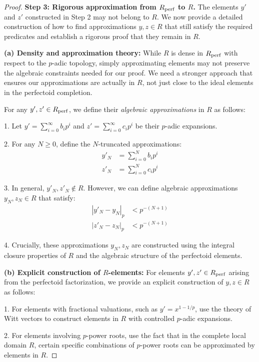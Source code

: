 \begin{proof}
\textbf{Step 3: Rigorous approximation from $R_{\operatorname{perf}}$ to $R$.}
The elements $y'$ and $z'$ constructed in Step 2 may not belong to $R$. We now provide a detailed construction of how to find approximations $y, z \in R$ that still satisfy the required predicates and establish a rigorous proof that they remain in $R$.

\textbf{(a) Density and approximation theory:} While $R$ is dense in $R_{\operatorname{perf}}$ with respect to the $p$-adic topology, simply approximating elements may not preserve the algebraic constraints needed for our proof. We need a stronger approach that ensures our approximations are actually in $R$, not just close to the ideal elements in the perfectoid completion.

For any $y', z' \in R_{\operatorname{perf}}$, we define their \textit{algebraic approximations} in $R$ as follows:

1. Let $y' = \sum_{i=0}^{\infty} b_i p^i$ and $z' = \sum_{i=0}^{\infty} c_i p^i$ be their $p$-adic expansions.

2. For any $N \geq 0$, define the $N$-truncated approximations:
\begin{align*}
y'_N &= \sum_{i=0}^{N} b_i p^i \\
z'_N &= \sum_{i=0}^{N} c_i p^i
\end{align*}

3. In general, $y'_N, z'_N \not\in R$. However, we can define algebraic approximations $y_N, z_N \in R$ that satisfy:
\begin{align*}
|y'_N - y_N|_p &< p^{-(N+1)} \\
|z'_N - z_N|_p &< p^{-(N+1)}
\end{align*}

4. Crucially, these approximations $y_N, z_N$ are constructed using the integral closure properties of $R$ and the algebraic structure of the perfectoid elements.

\textbf{(b) Explicit construction of $R$-elements:} For elements $y', z' \in R_{\operatorname{perf}}$ arising from the perfectoid factorization, we provide an explicit construction of $y, z \in R$ as follows:

1. For elements with fractional valuations, such as $y' = x^{1-1/p}$, use the theory of Witt vectors to construct elements in $R$ with controlled $p$-adic expansions.

2. For elements involving $p$-power roots, use the fact that in the complete local domain $R$, certain specific combinations of $p$-power roots can be approximated by elements in $R$.


\end{proof}
